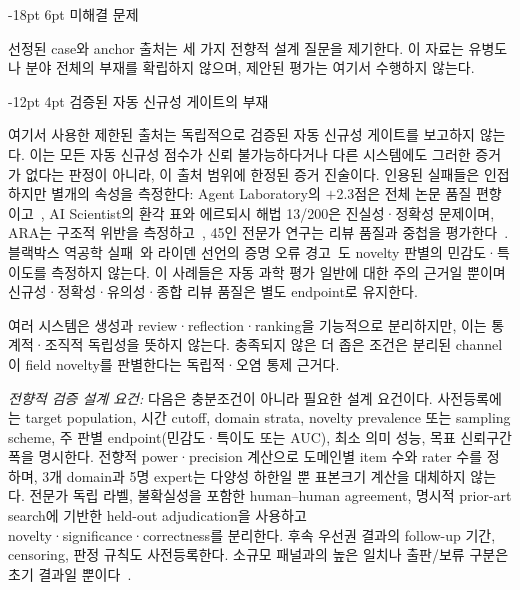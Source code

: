 \documentclass[11pt]{article}
\makeatletter
\renewcommand\section{\@startsection{section}{1}{\z@}%
  {-18pt \@plus -4pt \@minus -2pt}%
  {6pt \@plus 2pt}%
  {\normalfont\large\bfseries}}
\renewcommand\subsection{\@startsection{subsection}{2}{\z@}%
  {-12pt \@plus -2pt \@minus -2pt}%
  {4pt \@plus 1pt}%
  {\normalfont\normalsize\bfseries}}
\makeatother
\begin{document}
\section{미해결 문제}
\label{sec:openproblems}

선정된 case와 anchor 출처는 세 가지 전향적 설계 질문을 제기한다. 이 자료는 유병도나 분야 전체의 부재를 확립하지 않으며, 제안된 평가는 여기서 수행하지 않는다.

\subsection{검증된 자동 신규성 게이트의 부재}
\label{sec:op1}

여기서 사용한 제한된 출처는 독립적으로 검증된 자동 신규성 게이트를 보고하지 않는다. 이는 모든 자동 신규성 점수가 신뢰 불가능하다거나 다른 시스템에도 그러한 증거가 없다는 판정이 아니라, 이 출처 범위에 한정된 증거 진술이다. 인용된 실패들은 인접하지만 별개의 속성을 측정한다: Agent Laboratory의 $+$2.3점은 전체 논문 품질 편향이고~\citep{schmidgall2025agentlab}, AI Scientist의 환각 표와 에르되시 해법 13/200은 진실성·정확성 문제이며, ARA는 구조적 위반을 측정하고~\citep{liu2026lasthuman}, 45인 전문가 연구는 리뷰 품질과 중첩을 평가한다~\citep{kim2026aireviewers}. 블랙박스 역공학 실패~\citep{geng2025reliable}와 라이덴 선언의 증명 오류 경고~\citep{leiden2026}도 novelty 판별의 민감도·특이도를 측정하지 않는다. 이 사례들은 자동 과학 평가 일반에 대한 주의 근거일 뿐이며 신규성·정확성·유의성·종합 리뷰 품질은 별도 endpoint로 유지한다.

여러 시스템은 생성과 review·reflection·ranking을 기능적으로 분리하지만, 이는 통계적·조직적 독립성을 뜻하지 않는다. 충족되지 않은 더 좁은 조건은 분리된 channel이 field novelty를 판별한다는 독립적·오염 통제 근거다.

\textit{전향적 검증 설계 요건:} 다음은 충분조건이 아니라 필요한 설계 요건이다. 사전등록에는 target population, 시간 cutoff, domain strata, novelty prevalence 또는 sampling scheme, 주 판별 endpoint(민감도·특이도 또는 AUC), 최소 의미 성능, 목표 신뢰구간 폭을 명시한다. 전향적 power·precision 계산으로 도메인별 item 수와 rater 수를 정하며, 3개 domain과 5명 expert는 다양성 하한일 뿐 표본크기 계산을 대체하지 않는다. 전문가 독립 라벨, 불확실성을 포함한 human--human agreement, 명시적 prior-art search에 기반한 held-out adjudication을 사용하고 novelty·significance·correctness를 분리한다. 후속 우선권 결과의 follow-up 기간, censoring, 판정 규칙도 사전등록한다. 소규모 패널과의 높은 일치나 출판/보류 구분은 초기 결과일 뿐이다~\citep{liu2025researchbench}.
\end{document}
